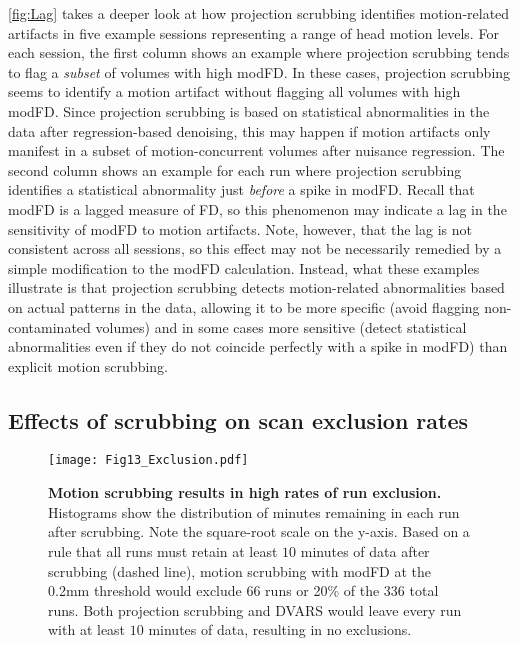 \documentclass{article}
\begin{document}
\autoref{fig:Lag} takes a deeper look at how projection scrubbing identifies motion-related artifacts in five example sessions representing a range of head motion levels. For each session, the first column shows an example where projection scrubbing tends to flag a \textit{subset} of volumes with high modFD. In these cases, projection scrubbing seems to identify a  motion artifact without flagging all volumes with high modFD. Since projection scrubbing is based on statistical abnormalities in the data after regression-based denoising, this may happen if motion artifacts only manifest in a subset of motion-concurrent volumes after nuisance regression.  The second column shows an example for each run where projection scrubbing identifies a statistical abnormality just \textit{before} a spike in modFD. Recall that modFD is a lagged measure of FD, so this phenomenon may indicate a lag in the sensitivity of modFD to motion artifacts. Note, however, that the lag is not consistent across all sessions, so this effect may not be necessarily remedied by a simple modification to the modFD calculation. Instead, what these examples illustrate is that projection scrubbing detects motion-related abnormalities based on actual patterns in the data, allowing it to be more specific (avoid flagging non-contaminated volumes) and in some cases more sensitive (detect statistical abnormalities even if they do not coincide perfectly with a spike in modFD) than explicit motion scrubbing.


\subsection{Effects of scrubbing on scan exclusion rates}

\begin{figure}
    \centering
    \texttt{[image: Fig13\_Exclusion.pdf]}
    \caption{\small \textbf{Motion scrubbing results in high rates of run exclusion.} Histograms show the distribution of minutes remaining in each run after scrubbing.  Note the square-root scale on the y-axis.  Based on a rule that all runs must retain at least $10$ minutes of data after scrubbing (dashed line), motion scrubbing with modFD at the 0.2mm threshold would exclude 66 runs or 20\% of the 336 total runs. Both projection scrubbing and DVARS would leave every run with at least $10$ minutes of data, resulting in no exclusions.}
    \label{fig:Exclusion}
\end{figure}
\end{document}
